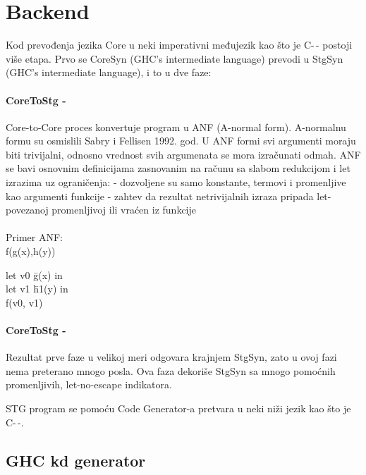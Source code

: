\section{Backend}
\label{sec:backend}
\label{slike_i_tabele}


Kod prevođenja jezika Core u neki imperativni međujezik kao što je C-\,- postoji više etapa.
Prvo se CoreSyn (GHC’s intermediate language) prevodi u StgSyn (GHC’s intermediate language), i to u dve faze:


\paragraph{CoreToStg - }

Core-to-Core proces konvertuje program u ANF (A-normal form). A-normalnu formu su osmislili Sabry i Fellisen 1992. god.  U ANF formi svi argumenti moraju biti trivijalni, odnosno vrednost svih argumenata se mora izračunati odmah. ANF se bavi osnovnim definicijama zasnovanim na \lambda računu sa slabom redukcijom i let izrazima uz ograničenja:
- dozvoljene su samo konstante, \lambda termovi i promenljive kao argumenti funkcije
- zahtev da rezultat netrivijalnih izraza pripada let-povezanoj promenljivoj ili vraćen iz funkcije \\ \\
Primer ANF: \\ f(g(x),h(y))\\

\begin{tabbing}
let v0 \= g(x) in \\
	\>let v1 \= h1(y) in \\
	\> \> f(v0, v1)
\end{tabbing}

\paragraph{CoreToStg - }

Rezultat prve faze u velikoj meri odgovara krajnjem StgSyn, zato u ovoj fazi nema preterano mnogo posla. Ova faza dekoriše StgSyn sa mnogo pomoćnih  promenljivih, let-no-escape indikatora.

STG program se pomoću  Code Generator-a pretvara u neki niži jezik kao što je C-\,-.

\subsection{GHC kd generator}

